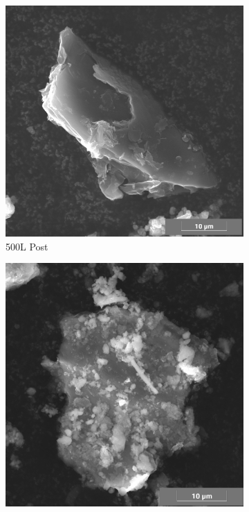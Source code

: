 \begin{figure}[H]
 \centering
    \begin{subfigure}{0.45\linewidth}
        \includegraphics[width=\linewidth]{images/500L POST11 lamellar.png}
		\caption{500L Post}
		\label{fig:500L_Post_Lamellar}
	   \end{subfigure}
	   \begin{subfigure}{0.43\linewidth}
		\includegraphics[width=\linewidth]{images/500X POST03 lamellar.png}

\end{subfigure}
\end{figure}
